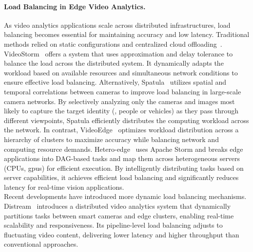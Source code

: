 \paragraph{Load Balancing in Edge Video Analytics.}
As video analytics applications scale across distributed infrastructures, load balancing becomes essential for maintaining accuracy and low latency.
Traditional methods relied on static configurations and centralized cloud offloading~\cite{jain2020spatula,201465videostorm,zhang2019hetero,hung2018videoedge}. VideoStorm~\cite{201465videostorm} offers a system that uses approximation and delay tolerance to balance the load across the distributed system. It dynamically adapts the workload based on available resources and simultaneous network conditions to ensure effective load balancing. Alternatively, Spatula~\cite{jain2020spatula} utilizes spatial and temporal correlations between cameras to improve load balancing in large-scale camera networks. By selectively analyzing only the cameras and images most likely to capture the target identity (\eg, people or vehicles) as they pass through different viewpoints, Spatula efficiently distributes the computing workload across the network. In contrast, VideoEdge~\cite{hung2018videoedge} optimizes workload distribution across a hierarchy of clusters to maximize accuracy while balancing network and computing resource demands.
Hetero-edge~\cite{zhang2019hetero} uses Apache Storm and breaks edge applications into DAG-based tasks and map them across heterogeneous servers (CPUs, \acrshort{gpu}s) for efficient execution. By intelligently distributing tasks based on server capabilities, it achieves efficient load balancing and significantly reduces latency for real-time vision applications.\\
Recent developments have introduced more dynamic load balancing mechanisms. Distream~\cite{zeng2020distream} introduces a distributed video analytics system that dynamically partitions tasks between smart cameras and edge clusters, enabling real-time scalability and responsiveness. Its pipeline-level load balancing adjusts to fluctuating video content, delivering lower latency and higher throughput than conventional approaches.

